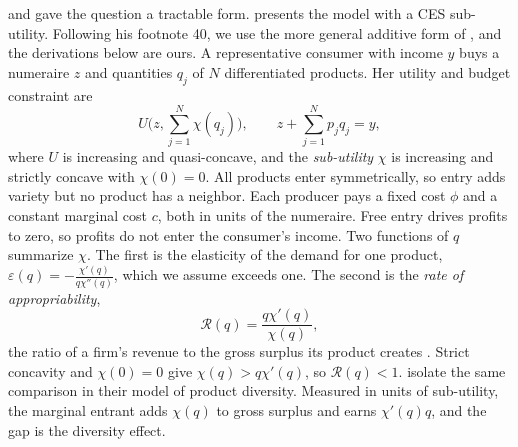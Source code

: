   and \citet{DixitStiglitz1977} gave the question a tractable form.
 presents the model with a CES sub-utility. Following his footnote 40, we use the
more general additive form of \citet{DixitStiglitz1977}, and the derivations below are ours. A representative consumer with income
$y$ buys a numeraire $z$ and quantities $q_j$ of $N$ differentiated products. Her utility and budget constraint are
\begin{equation}\label{eq:04-dss-utility}
U\Big(z, \sum_{j=1}^N\chi(q_j)\Big), \qquad z + \sum_{j=1}^Np_jq_j = y ,
\end{equation}
where $U$ is increasing and quasi-concave, and the \emph{sub-utility} $\chi$ is increasing and strictly concave with
$\chi(0) = 0$. All products enter symmetrically, so entry adds variety but no product has a neighbor. Each producer
pays a fixed cost $\phi$ and a constant marginal cost $c$, both in units of the numeraire. Free entry drives profits to
zero, so profits do not enter the consumer's income. Two functions of $q$ summarize $\chi$. The first is the
elasticity of the demand for one product, $\varepsilon(q) = -\frac{\chi'(q)}{q\chi''(q)}$, which we assume exceeds one.
The second is the \emph{rate of appropriability},
\begin{equation}\label{eq:04-appropriability}
\mathcal{R}(q) = \frac{q\chi'(q)}{\chi(q)} ,
\end{equation}
the ratio of a firm's revenue to the gross surplus its product creates \citep[Section 7.5.2]{Tirole1988}. Strict
concavity and $\chi(0) = 0$ give $\chi(q) > q\chi'(q)$, so $\mathcal{R}(q) < 1$. 
isolate the same comparison in their model of product diversity. Measured in units of sub-utility, the marginal
entrant adds $\chi(q)$ to gross surplus and earns $\chi'(q)q$, and the gap is the diversity effect.

